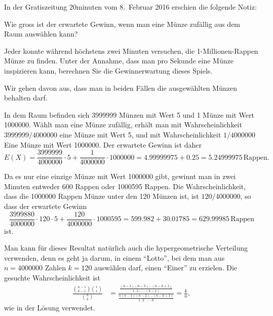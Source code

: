 In der Gratiszeitung 20minuten vom 8.~Februar 2016 erschien die folgende
Notiz:
\begin{center}
\end{center}
\begin{teilaufgaben}
\item Wie gross ist der erwartete Gewinn, wenn man eine Münze zufällig
aus dem Raum auswählen kann?
\item
Jeder konnte während höchstens zwei Minuten versuchen, die 1-Millionen-Rappen
Münze zu finden. 
Unter der Annahme, dass man pro Sekunde eine Münze inspizieren kann, 
berechnen Sie die Gewinnerwartung dieses Spiels.
\end{teilaufgaben}
Wir gehen davon aus, dass man in beiden Fällen die ausgewählten Münzen
behalten darf.


\begin{loesung}
\begin{teilaufgaben}
\item
In dem Raum befinden sich 3999999 Münzen mit Wert 5 und 1 Münze mit
Wert 1000000.
Wählt man eine Münze zufällig, erhält man mit Wahrscheinlichkeit
$3999999/4000000$ eine Münze mit Wert 5, und mit Wahrscheinlichkeit
$1/4000000$ Eine Münze mit Wert 1000000.
Der erwartete Gewinn ist daher
\[
E(X) = \frac{3999999}{4000000}\cdot 5 + \frac{1}{4000000}\cdot 1000000
=4.99999975 + 0.25 = 5.24999975\,\text{Rappen}.
\]
\item
Da es nur eine einzige Münze mit Wert 1000000 gibt, gewinnt man
in zwei Minuten entweder 600 Rappen oder 1000595 Rappen.
Die Wahrscheinlichkeit, dass die 1000000 Rappen Münze unter den
120 Münzen ist, ist $120/4000000$, so dass der erwartete Gewinn
\[
\frac{3999880}{4000000}\cdot 120\cdot 5
+
\frac{120}{4000000}\cdot 1000595
=
599.982 + 30.01785=629.99985\,\text{Rappen}
\]
ist.
\end{teilaufgaben}
\end{loesung}

\begin{diskussion}
Man kann für dieses Resultat natürlich auch die hypergeometrische
Verteilung verwenden, denn es geht ja darum, in einem ``Lotto'', bei dem
man aus $n=4000000$ Zahlen $k=120$ auswählen darf, einen ``Einer''
zu erzielen.
Die gesuchte Wahrscheinlichkeit ist
\begin{align*}
\frac{\displaystyle\binom{n-1}{k-1}\binom{1}{1}}{\displaystyle\binom{n}{k}}
&=
\frac{\displaystyle\frac{(n-1)(n-2)\dots(n-k+1)}{1\cdot 2\cdot\dots\cdot (k-1)}}%
{\displaystyle\frac{n(n-1)(n-2)\dots(n-k+1)}{1\cdot 2\cdot\dots\cdots k}}
=\frac{k}{n},
\end{align*}
wie in der Lösung verwendet.
\end{diskussion}

